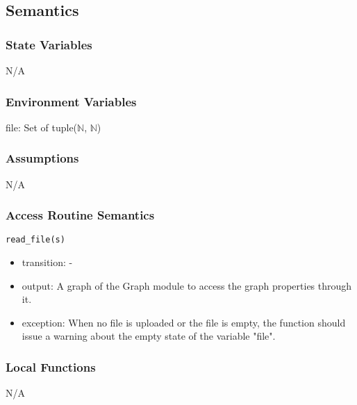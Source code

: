 \documentclass[12pt, titlepage]{article}
\begin{document}
\subsection{Semantics}

\subsubsection{State Variables}

N/A

\subsubsection{Environment Variables}

file: Set of tuple($\mathbb{N}$, $\mathbb{N}$)

\subsubsection{Assumptions}

N/A

\subsubsection{Access Routine Semantics}

\noindent \texttt{read\_file(s)}
\begin{itemize}
\item transition: - 
\item output: A graph of the Graph module to access the graph properties through it.
\item exception: When no file is uploaded or the file is empty, the function should issue a warning about the empty state of the variable "file".  
\end{itemize}



\subsubsection{Local Functions}

N/A

\newpage
\end{document}
